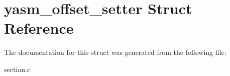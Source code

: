 \hypertarget{structyasm__offset__setter}{\section{yasm\-\_\-offset\-\_\-setter Struct Reference}
\label{structyasm__offset__setter}
}


The documentation for this struct was generated from the following file\-:\begin{DoxyCompactItemize}
\item 
section.\-c\end{DoxyCompactItemize}
